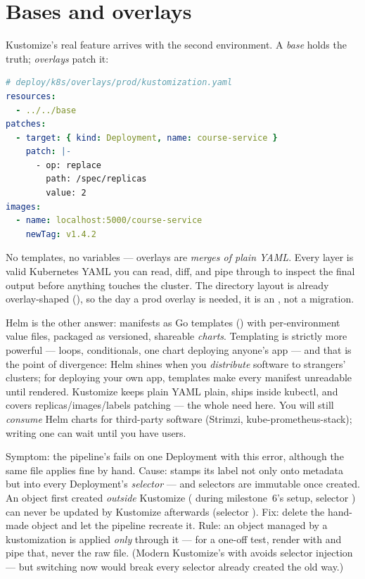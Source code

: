 \section{Bases and overlays}

Kustomize's real feature arrives with the second environment. A
\emph{base} holds the truth; \emph{overlays} patch it:

\begin{lstlisting}[language=yaml]
# deploy/k8s/overlays/prod/kustomization.yaml
resources:
  - ../../base
patches:
  - target: { kind: Deployment, name: course-service }
    patch: |-
      - op: replace
        path: /spec/replicas
        value: 2
images:
  - name: localhost:5000/course-service
    newTag: v1.4.2
\end{lstlisting}

No templates, no variables --- overlays are \emph{merges of plain YAML}.
Every layer is valid Kubernetes YAML you can read, diff, and pipe
through  to inspect the final output before
anything touches the cluster. The directory layout is already
overlay-shaped (), so the day a prod overlay is needed, it
is an , not a migration.

\begin{decision}
Helm is the other answer: manifests as Go templates
() with per-environment
value files, packaged as versioned, shareable \emph{charts}. Templating
is strictly more powerful --- loops, conditionals, one chart deploying
anyone's app --- and that is the point of divergence: Helm shines when
you \emph{distribute} software to strangers' clusters; for deploying
your own app, templates make every manifest unreadable until rendered.
Kustomize keeps plain YAML plain, ships inside kubectl, and covers
replicas/images/labels patching --- the whole need here. You will still
\emph{consume} Helm charts for third-party software (Strimzi,
kube-prometheus-stack); writing one can wait until you have users.
\end{decision}

\begin{pitfall}
Symptom: the pipeline's  fails on one
Deployment with this error, although the same file applies fine by
hand. Cause:  stamps its label not only onto
metadata but into every Deployment's \emph{selector} --- and selectors
are immutable once created. An object first created \emph{outside}
Kustomize ( during milestone~6's
setup, selector ) can never be updated by
Kustomize afterwards (selector
). Fix: delete the
hand-made object and let the pipeline recreate it. Rule: an object
managed by a kustomization is applied \emph{only} through it --- for a
one-off test, render with  and pipe that,
never the raw file. (Modern Kustomize's  with
 avoids selector injection --- but
switching now would break every selector already created the old way.)
\end{pitfall}

